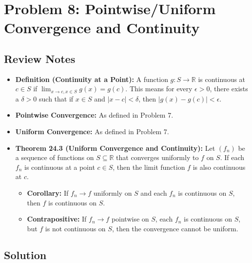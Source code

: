 \documentclass{article}
\newcommand{\R}{\mathbb{R}}
\begin{document}
\section*{Problem 8: Pointwise/Uniform Convergence and Continuity}

\subsection*{Review Notes}

\begin{itemize}
    \item \textbf{Definition (Continuity at a Point):} A function \(g: S \to \R\) is continuous at \(c \in S\) if \(\lim_{x\to c, x\in S} g(x) = g(c)\). This means for every \(\epsilon > 0\), there exists a \(\delta > 0\) such that if \(x \in S\) and \(|x-c| < \delta\), then \(|g(x) - g(c)| < \epsilon\).
    \item \textbf{Pointwise Convergence:} As defined in Problem 7.
    \item \textbf{Uniform Convergence:} As defined in Problem 7.
    \item \textbf{Theorem 24.3 (Uniform Convergence and Continuity):} Let \((f_n)\) be a sequence of functions on \(S \subseteq \R\) that converges uniformly to \(f\) on \(S\). If each \(f_n\) is continuous at a point \(c \in S\), then the limit function \(f\) is also continuous at \(c\).
        \begin{itemize}
            \item \textbf{Corollary:} If \(f_n \to f\) uniformly on \(S\) and each \(f_n\) is continuous on \(S\), then \(f\) is continuous on \(S\).
            \item \textbf{Contrapositive:} If \(f_n \to f\) pointwise on \(S\), each \(f_n\) is continuous on \(S\), but \(f\) is not continuous on \(S\), then the convergence cannot be uniform.
        \end{itemize}
\end{itemize}

\subsection*{Solution}
\end{document}
